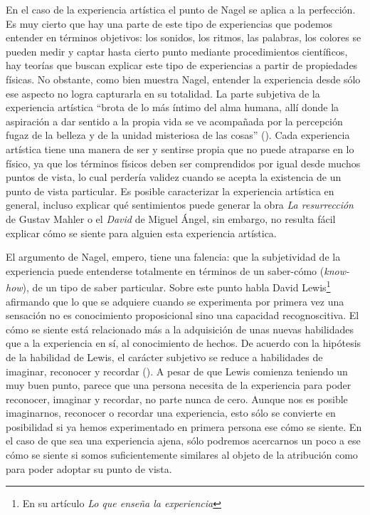 \documentclass[]{book}
\begin{document}
\begin{refsection}
En el caso de la experiencia artística el punto de Nagel se aplica a la
perfección. Es muy cierto que hay una parte de este tipo de experiencias
que podemos entender en términos objetivos: los sonidos, los ritmos, las
palabras, los colores se pueden medir y captar hasta cierto punto
mediante procedimientos científicos, hay teorías que buscan explicar
este tipo de experiencias a partir de propiedades físicas. No obstante,
como bien muestra Nagel, entender la experiencia desde sólo ese aspecto
no logra capturarla en su totalidad. La parte subjetiva de la
experiencia artística ``brota de lo más íntimo del alma humana, allí
donde la aspiración a dar sentido a la propia vida se ve acompañada por
la percepción fugaz de la belleza y de la unidad misteriosa de las
cosas'' (\cite{Juan1999}). Cada experiencia artística tiene una manera de ser y sentirse
propia que no puede atraparse en lo físico, ya que los términos físicos
deben ser comprendidos por igual desde muchos puntos de vista, lo cual
perdería validez cuando se acepta la existencia de un punto de vista
particular. Es posible caracterizar la experiencia artística en general,
incluso explicar qué sentimientos puede generar la obra \emph{La
resurrección} de Gustav Mahler o el \emph{David} de Miguel Ángel, sin
embargo, no resulta fácil explicar cómo se siente para alguien esta
experiencia artística.

El argumento de Nagel, empero, tiene una falencia: que la subjetividad
de la experiencia puede entenderse totalmente en términos de un
saber-cómo (\emph{know-how}), de un tipo de saber particular. Sobre este
punto habla David Lewis\footnote{En su artículo \emph{Lo que enseña la
  experiencia}} afirmando que lo que se adquiere cuando se experimenta
por primera vez una sensación no es conocimiento proposicional sino una
capacidad recognoscitiva. El cómo se siente está relacionado más a la
adquisición de unas nuevas habilidades que a la experiencia en sí, al
conocimiento de hechos. De acuerdo con la hipótesis de la habilidad de
Lewis, el carácter subjetivo se reduce a habilidades de imaginar,
reconocer y recordar (\cite{Lewis2003}). A pesar de que Lewis comienza teniendo un muy buen
punto, parece que una persona necesita de la experiencia para poder
reconocer, imaginar y recordar, no parte nunca de cero. Aunque nos es
posible imaginarnos, reconocer o recordar una experiencia, esto sólo se
convierte en posibilidad si ya hemos experimentado en primera persona
ese cómo se siente. En el caso de que sea una experiencia ajena, sólo
podremos acercarnos un poco a ese cómo se siente si somos
suficientemente similares al objeto de la atribución como para poder
adoptar su punto de vista.


\end{refsection}
\end{document}
